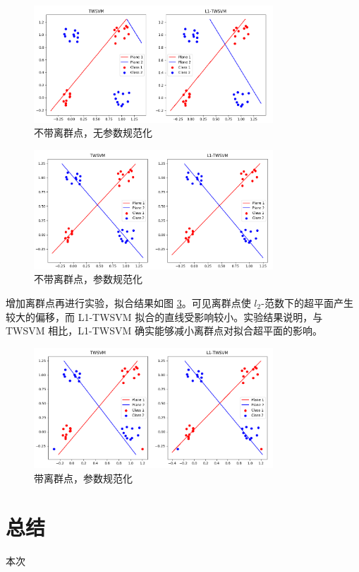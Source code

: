 \begin{figure}[ht]
\centering
\includegraphics[width=0.8\textwidth]{./img/without_norm_cons.png}
\caption{不带离群点，无参数规范化}
\label{no_out_no_reg}
\end{figure}

\begin{figure}[ht]
\centering
\includegraphics[width=0.8\textwidth]{./img/without_outliers.png}
\caption{不带离群点，参数规范化}
\label{no_out}
\end{figure}

增加离群点再进行实验，拟合结果如图 \ref{outliers}。可见离群点使 $l_2$-范数下的超平面产生较大的偏移，而 L1-TWSVM 拟合的直线受影响较小。实验结果说明，与 TWSVM 相比，L1-TWSVM 确实能够减小离群点对拟合超平面的影响。

\begin{figure}[ht]
\centering
\includegraphics[width=0.8\textwidth]{./img/with_outliers.png}
\caption{带离群点，参数规范化}
\label{outliers}
\end{figure}

\section{总结}

本次
